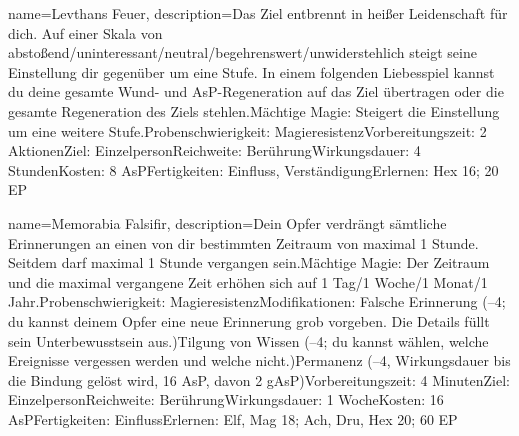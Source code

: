 {
    name={Levthans Feuer},
    description={Das Ziel entbrennt in heißer Leidenschaft für dich. Auf einer Skala von abstoßend/uninteressant/neutral/begehrenswert/unwiderstehlich steigt seine Einstellung dir gegenüber um eine Stufe. In einem folgenden Liebesspiel kannst du deine gesamte Wund- und AsP-Regeneration auf das Ziel übertragen oder die gesamte Regeneration des Ziels stehlen.\newline Mächtige Magie: Steigert die Einstellung um eine weitere Stufe.\newline Probenschwierigkeit: Magieresistenz\newline Vorbereitungszeit: 2 Aktionen\newline Ziel: Einzelperson\newline Reichweite: Berührung\newline Wirkungsdauer: 4 Stunden\newline Kosten: 8 AsP\newline Fertigkeiten: Einfluss, Verständigung\newline Erlernen: Hex 16; 20 EP}
}


{
    name={Memorabia Falsifir},
    description={Dein Opfer verdrängt sämtliche Erinnerungen an einen von dir bestimmten Zeitraum von maximal 1 Stunde. Seitdem darf maximal 1 Stunde vergangen sein.\newline Mächtige Magie: Der Zeitraum und die maximal vergangene Zeit erhöhen sich auf 1 Tag/1 Woche/1 Monat/1 Jahr.\newline Probenschwierigkeit: Magieresistenz\newline Modifikationen: Falsche Erinnerung (–4; du kannst deinem Opfer eine neue Erinnerung grob vorgeben. Die Details füllt sein Unterbewusstsein aus.)\newline Tilgung von Wissen (–4; du kannst wählen, welche Ereignisse vergessen werden und welche nicht.)\newline Permanenz (–4, Wirkungsdauer bis die Bindung gelöst wird, 16 AsP, davon 2 gAsP)\newline Vorbereitungszeit: 4 Minuten\newline Ziel: Einzelperson\newline Reichweite: Berührung\newline Wirkungsdauer: 1 Woche\newline Kosten: 16 AsP\newline Fertigkeiten: Einfluss\newline Erlernen: Elf, Mag 18; Ach, Dru, Hex 20; 60 EP}
}


